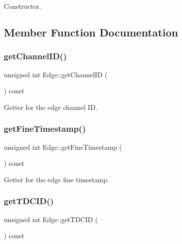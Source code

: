 Constructor. 



\subsection{Member Function Documentation}
\mbox{\label{class_edge_a5420f88056570dc33c697c99a211634c}} 
\subsubsection{\texorpdfstring{get\+Channel\+I\+D()}{getChannelID()}}
{\footnotesize\ttfamily unsigned int Edge\+::get\+Channel\+ID (\begin{DoxyParamCaption}{ }\end{DoxyParamCaption}) const\hspace{0.3cm}{\ttfamily [inline]}}



Getter for the edge channel ID. 

\mbox{\label{class_edge_a67a04612cd6037408c691ab35d076ed7}} 
\subsubsection{\texorpdfstring{get\+Fine\+Timestamp()}{getFineTimestamp()}}
{\footnotesize\ttfamily unsigned int Edge\+::get\+Fine\+Timestamp (\begin{DoxyParamCaption}{ }\end{DoxyParamCaption}) const\hspace{0.3cm}{\ttfamily [inline]}}



Getter for the edge fine timestamp. 

\mbox{\label{class_edge_a43d8c30ccdc68a6f7a37bb0163b6829d}} 
\subsubsection{\texorpdfstring{get\+T\+D\+C\+I\+D()}{getTDCID()}}
{\footnotesize\ttfamily unsigned int Edge\+::get\+T\+D\+C\+ID (\begin{DoxyParamCaption}{ }\end{DoxyParamCaption}) const\hspace{0.3cm}{\ttfamily [inline]}}



